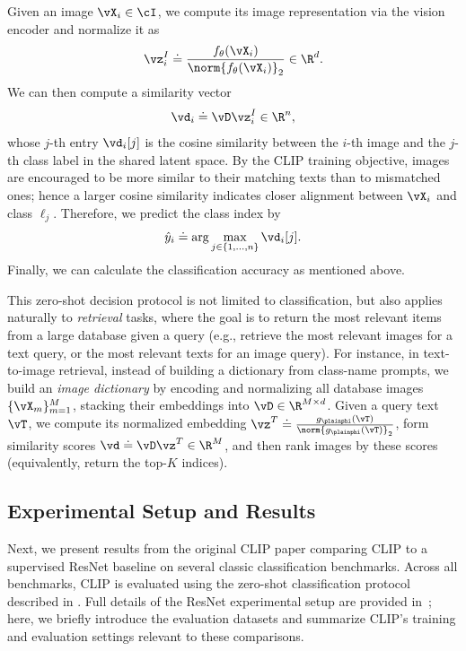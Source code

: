 \documentclass[../../book-main.tex]{subfiles}
\begin{document}
Given an image \(\vX_{i} \in \cI\), we compute its image representation via the vision encoder and normalize it as
\begin{equation}
\vz_{i}^{I} \doteq \frac{f_{\theta}(\vX_{i})}{\norm{f_{\theta}(\vX_{i})}_{2}} \in \R^{d} .
\end{equation}
We can then compute a similarity vector
\begin{equation}
\vd_{i} \doteq \vD\vz_{i}^{I} \in \R^{n} ,
\end{equation}
whose \(j\)-th entry \(\vd_{i}[j]\) is the cosine similarity between the \(i\)-th image and the \(j\)-th class label
in the shared latent space.
By the CLIP training objective, images are encouraged to be more similar to their
matching texts than to mismatched ones;
hence a larger cosine similarity indicates closer alignment between
\(\vX_{i}\) and class \(\ell_{j}\).
Therefore, we predict the class index by
\begin{equation}
\hat{y}_{i} \doteq \arg\max_{j \in \{1, \dots, n\}} \vd_{i}[j] .
\end{equation}
Finally, we can calculate the classification accuracy as mentioned above.

This zero-shot decision protocol is not limited to classification, but also applies naturally to \textit{retrieval} tasks,
where the goal is to return the most relevant items from a large database given a query (e.g., retrieve the most
relevant images for a text query, or the most relevant texts for an image query).
For instance, in text-to-image
retrieval, instead of building a dictionary from class-name prompts, we build an \textit{image dictionary} by encoding
and normalizing all database images \(\{\vX_{m}\}_{m=1}^{M}\), stacking their embeddings into
\(\vD \in \R^{M \times d}\).
Given a query text \(\vT\), we compute its normalized embedding
\(\vz^{T} \doteq \frac{g_{\plainphi}(\vT)}{\norm{g_{\plainphi}(\vT)}_{2}}\), form similarity scores
\(\vd \doteq \vD\vz^{T} \in \R^{M}\), and then rank images by these scores (equivalently, return the top-\(K\)
indices).

\subsection{Experimental Setup and Results}

Next, we present results from the original CLIP paper comparing CLIP to a supervised ResNet baseline on several classic classification benchmarks.
Across all benchmarks, CLIP is evaluated using the zero-shot classification protocol described in .
Full details of the ResNet experimental setup are provided in~\citep{He2016-lc};
here, we briefly introduce the evaluation datasets and summarize CLIP's training and evaluation settings relevant to these comparisons.
\end{document}
